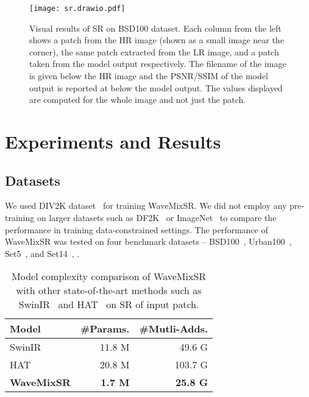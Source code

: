 \documentclass{article}
\begin{document}
\begin{figure}[!b]
\centering
\texttt{[image: sr.drawio.pdf]}
\caption{Visual results of  SR on BSD100 dataset. Each column from the left shows a patch from the HR image (shown as a small image near the corner), the same patch extracted from the LR image, and a patch taken from the model output respectively. The filename of the image is given below the HR image and the PSNR/SSIM of the model output is reported at below the model output. The values displayed are computed for the whole image and not just the patch.}
\label{fig:images}
\end{figure}



\section{Experiments and Results}

\subsection{Datasets}

We used DIV2K dataset~\cite{8014884} for training WaveMixSR. We did not employ any pre-training on larger datasets such as DF2K~\cite{8014884} or ImageNet~\cite{5206848} to compare the performance in training data-constrained settings. The performance of WaveMixSR was tested on four benchmark datasets -- BSD100~\cite{937655}, Urban100~\cite{7299156}, Set5~\cite{BMVC.26.135}, and Set14~\cite{10.1007/978-3-642-27413-8_47}, .


\begin{table}[]
\centering
\begin{tabular}{@{}lrr@{}}
\toprule
Model & \#Params. & \#Mutli-Adds. \\ \midrule
SwinIR~\cite{liang2021swinir} & 11.8 M & 49.6 G \\
HAT~\cite{chen2023activating} & 20.8 M & 103.7 G \\
\textbf{WaveMixSR} & \textbf{1.7 M} & \textbf{25.8 G} \\ \bottomrule
\end{tabular}
\vspace{2mm}
\caption{Model complexity comparison of WaveMixSR with other state-of-the-art methods such as SwinIR~\cite{liang2021swinir} and HAT~\cite{chen2023activating} on  SR of  input patch.}
\label{tab:param}
\end{table}
\end{document}
